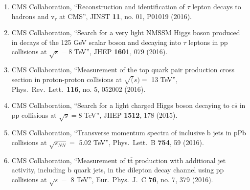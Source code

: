 \begin{itemize}
\begin{enumerate}
\item CMS Collaboration, ``Reconstruction and identification of $\tau$ lepton decays to hadrons and v$_\tau$ at CMS'', JINST {\bf 11}, no. 01, P01019 (2016).

\item CMS Collaboration, ``Search for a very light NMSSM Higgs boson produced in decays of the 125 GeV scalar boson and decaying into $\tau$ leptons in pp collisions at $\sqrt{s}=8$ TeV'', JHEP {\bf 1601}, 079 (2016).

\item CMS Collaboration, ``Measurement of the top quark pair production cross section in proton-proton collisions at $\sqrt(s) =$ 13 TeV'', Phys.\ Rev.\ Lett.\  {\bf 116}, no. 5, 052002 (2016).

\item CMS Collaboration, ``Search for a light charged Higgs boson decaying to $ \mathrm{c}\overline{\mathrm{s}} $ in pp collisions at $ \sqrt{s}=8 $ TeV'', JHEP {\bf 1512}, 178 (2015).

\item CMS Collaboration, ``Transverse momentum spectra of inclusive b jets in pPb collisions at $\sqrt{s_{NN}} = $ 5.02 TeV'', Phys.\ Lett.\ B {\bf 754}, 59 (2016).

\item CMS Collaboration, ``Measurement of $\mathrm {t}\overline{\mathrm {t}}$ production with additional jet activity, including $\mathrm {b}$ quark jets, in the dilepton decay channel using pp collisions at $\sqrt{s} =$ 8 TeV'', Eur.\ Phys.\ J.\ C {\bf 76}, no. 7, 379 (2016).


\end{enumerate}
\end{itemize}
